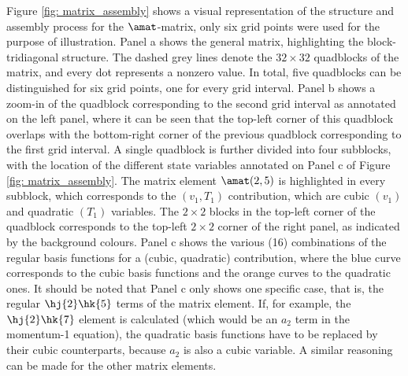 Figure \ref{fig: matrix_assembly} shows a visual representation of the structure and assembly process for the $\amat$-matrix, only six grid points were used for the purpose of illustration. Panel a shows the general matrix, highlighting the block-tridiagonal structure. The dashed grey lines denote the $32 \times 32$ quadblocks of the matrix, and every dot represents a nonzero value. In total, five quadblocks can be distinguished for six grid points, one for every grid interval. Panel b shows a zoom-in of the quadblock corresponding to the second grid interval as annotated on the left panel, where it can be seen that the top-left corner of this quadblock overlaps with the bottom-right corner of the previous quadblock corresponding to the first grid interval. A single quadblock is further divided into four subblocks, with the location of the different state variables annotated on Panel c of Figure \ref{fig: matrix_assembly}.
The matrix element $\amat(2, 5)$ is highlighted in every subblock, which corresponds to the $(v_1, T_1)$ contribution, which are cubic $(v_1)$ and quadratic $(T_1)$ variables. The $2 \times 2$ blocks in the top-left corner of the quadblock corresponds to the top-left $2 \times 2$ corner of the right panel, as indicated by the background colours. Panel c shows the various (16) combinations of the regular basis functions for a (cubic, quadratic) contribution, where the blue curve corresponds to the cubic basis functions and the orange curves to the quadratic ones. It should be noted that Panel c only shows one specific case, that is, the regular $\hj{2}\hk{5}$ terms of the matrix element. If, for example, the $\hj{2}\hk{7}$ element is calculated (which would be an $a_2$ term in the momentum-1 equation), the quadratic basis functions have to be replaced by their cubic counterparts, because $a_2$ is also a cubic variable. A similar reasoning can be made for the other matrix elements. \vfill

